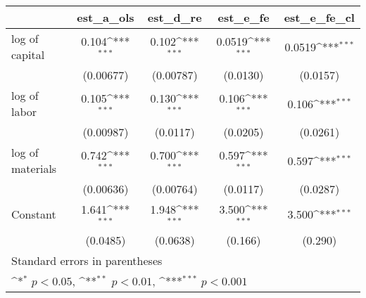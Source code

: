 {
\def\sym#1{\ifmmode^{#1}\else\(^{#1}\)\fi}
\begin{tabular}{l*{4}{c}}
\hline\hline
                    &\multicolumn{1}{c}{est\_a\_ols}&\multicolumn{1}{c}{est\_d\_re}&\multicolumn{1}{c}{est\_e\_fe}&\multicolumn{1}{c}{est\_e\_fe\_cl}\\
\hline
log of capital      &       0.104\sym{***}&       0.102\sym{***}&      0.0519\sym{***}&      0.0519\sym{***}\\
                    &   (0.00677)         &   (0.00787)         &    (0.0130)         &    (0.0157)         \\
[1em]
log of labor        &       0.105\sym{***}&       0.130\sym{***}&       0.106\sym{***}&       0.106\sym{***}\\
                    &   (0.00987)         &    (0.0117)         &    (0.0205)         &    (0.0261)         \\
[1em]
log of materials    &       0.742\sym{***}&       0.700\sym{***}&       0.597\sym{***}&       0.597\sym{***}\\
                    &   (0.00636)         &   (0.00764)         &    (0.0117)         &    (0.0287)         \\
[1em]
Constant            &       1.641\sym{***}&       1.948\sym{***}&       3.500\sym{***}&       3.500\sym{***}\\
                    &    (0.0485)         &    (0.0638)         &     (0.166)         &     (0.290)         \\
\hline\hline
\multicolumn{5}{l}{\footnotesize Standard errors in parentheses}\\
\multicolumn{5}{l}{\footnotesize \sym{*} \(p<0.05\), \sym{**} \(p<0.01\), \sym{***} \(p<0.001\)}\\
\end{tabular}
}
